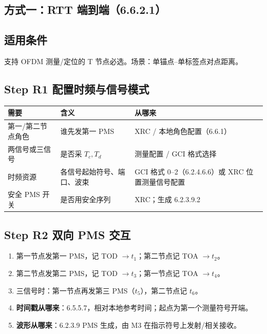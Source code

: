 \documentclass[11pt,a4paper]{ctexart}
\begin{document}
\subsection{方式一：RTT 端到端（6.6.2.1）}

\subsection{适用条件}

支持 OFDM 测量/定位的 T 节点必选。场景：单锚点--单标签点对点距离。

\subsection{Step R1 配置时频与信号模式}

\begin{table}[h]
\centering
\small
\begin{tabular}{L{3cm}L{5.5cm}L{4.5cm}}
\toprule
\textbf{需要} & \textbf{含义} & \textbf{从哪来} \\
\midrule
第一/第二节点角色 & 谁先发第一 PMS & XRC / 本地角色配置（6.6.1） \\
两信号或三信号 & 是否采 $T_c,T_d$ & 测量配置 / GCI 格式选择 \\
时频资源 & 各信号起始符号、端口、波束 & GCI 格式 0--2（6.2.4.6.6）或 XRC 位置测量信号配置 \\
安全 PMS 开关 & 是否用安全序列 & XRC；生成 6.2.3.9.2 \\
\bottomrule
\end{tabular}
\end{table}

\subsection{Step R2 双向 PMS 交互}

\begin{enumerate}
  \item 第一节点发第一 PMS，记 TOD $\rightarrow t_1$；第二节点记 TOA $\rightarrow t_2$。
  \item 第二节点发第二 PMS，记 TOD $\rightarrow t_3$；第一节点记 TOA $\rightarrow t_4$。
  \item 三信号时：第一节点再发第三 PMS（$t_5$），第二节点记 $t_6$。
  \item \textbf{时间戳从哪来}：6.5.5.7，相对本地参考时间；起点为第一个测量符号开端。
  \item \textbf{波形从哪来}：6.2.3.9 PMS 生成，由 M3 在指示符号上发射/相关接收。
\end{enumerate}
\end{document}
